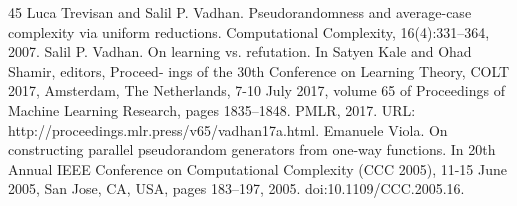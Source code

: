 \documentclass[10pt,a4paper]{article}
\begin{document}
\begin{thebibliography}{45}
 Luca Trevisan and Salil P. Vadhan. Pseudorandomness and average-case complexity via uniform reductions. Computational Complexity, 16(4):331–364, 2007.
 Salil P. Vadhan. On learning vs. refutation. In Satyen Kale and Ohad Shamir, editors, Proceed- ings of the 30th Conference on Learning Theory, COLT 2017, Amsterdam, The Netherlands, 7-10 July 2017, volume 65 of Proceedings of Machine Learning Research, pages 1835–1848. PMLR, 2017. URL: http://proceedings.mlr.press/v65/vadhan17a.html.
 Emanuele Viola. On constructing parallel pseudorandom generators from one-way functions. In 20th Annual IEEE Conference on Computational Complexity (CCC 2005), 11-15 June 2005, San Jose, CA, USA, pages 183–197, 2005. doi:10.1109/CCC.2005.16.
\end{thebibliography}
\end{document}
